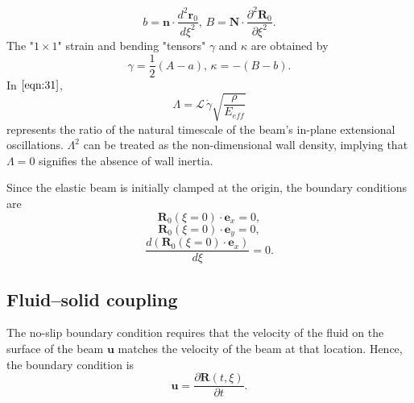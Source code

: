\documentclass[12pt,MSc,twoside]{muthesis_2020}
\begin{document}
\begin{equation}
	\label{eqn:34}
	b=\textbf{n}\cdot\frac{d^2\textbf{r}_0}{d\xi^2},\,B=\textbf{N}\cdot\frac{\partial^2\textbf{R}_0}{\partial\xi^2}.
\end{equation}
The "$1\times1$" strain and bending "tensors" $\gamma$ and $\kappa$ are obtained by
\begin{equation}
	\label{eqn:35}
\gamma=\frac{1}{2}(A-a),\,\kappa=-(B-b).
\end{equation}
In $\eqref{eqn:31}$,
\begin{equation}
	\label{eqn:36}
	\Lambda=\mathcal{L}\,\dot{\gamma}\sqrt{\frac{\rho}{E_{eff}}}
\end{equation}
represents the ratio of the natural timescale of the beam's in-plane extensional oscillations. 
$\Lambda^2$ can be treated as the non-dimensional wall density, implying that $\Lambda=0$ signifies the absence of wall inertia.

Since the elastic beam is initially clamped at the origin, the boundary conditions are
\begin{equation}
    \label{eqn:58}
	\mathbf{R}_0(\xi=0)\cdot\mathbf{e}_x=0,
\end{equation}
\begin{equation}
    \label{eqn:59}
	\mathbf{R}_0(\xi=0)\cdot\mathbf{e}_y=0,
\end{equation}
\begin{equation}
    \label{eqn:60}
	\frac{d\left(\mathbf{R}_0(\xi=0)\cdot\mathbf{e}_x\right)}{d\xi}=0.
\end{equation}

\subsection{Fluid–solid coupling}
The no-slip boundary condition requires that the velocity of the fluid on the surface of the beam $\mathbf{u}$ matches the velocity of the beam at that location. Hence, the boundary condition is 
\begin{equation}
    \label{eqn:100}
	\mathbf{u}=\frac{\partial \mathbf{R}(t,\xi)}{\partial t}.
\end{equation}
\end{document}
